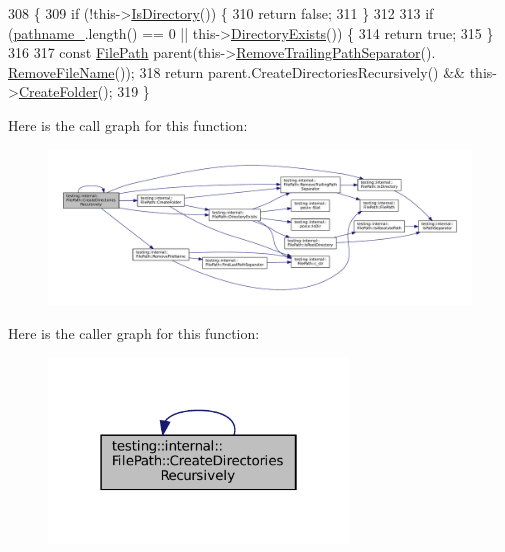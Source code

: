 \begin{DoxyCode}
308                                                   \{
309   \textcolor{keywordflow}{if} (!this->\hyperlink{classtesting_1_1internal_1_1FilePath_a73fc042ad65e85bbecb956eb4603a6f2}{IsDirectory}()) \{
310     \textcolor{keywordflow}{return} \textcolor{keyword}{false};
311   \}
312 
313   \textcolor{keywordflow}{if} (\hyperlink{classtesting_1_1internal_1_1FilePath_a12ce28a0015f85604e0372230fa18d6e}{pathname\_}.length() == 0 || this->\hyperlink{classtesting_1_1internal_1_1FilePath_a74ba8435e822d77f79f137c38de9bfeb}{DirectoryExists}()) \{
314     \textcolor{keywordflow}{return} \textcolor{keyword}{true};
315   \}
316 
317   \textcolor{keyword}{const} \hyperlink{classtesting_1_1internal_1_1FilePath_a3504a51accbca78a52fe586133ea5499}{FilePath} parent(this->\hyperlink{classtesting_1_1internal_1_1FilePath_ab47ada111cc940cf2359f6533bada6ca}{RemoveTrailingPathSeparator}().
      \hyperlink{classtesting_1_1internal_1_1FilePath_a49e030b5a62ca7dcc7f920a63a96fa55}{RemoveFileName}());
318   \textcolor{keywordflow}{return} parent.CreateDirectoriesRecursively() && this->\hyperlink{classtesting_1_1internal_1_1FilePath_ae3a455e7c9fc967c2443b703e958f8bd}{CreateFolder}();
319 \}
\end{DoxyCode}
Here is the call graph for this function\+:
\nopagebreak
\begin{figure}[H]
\begin{center}
\leavevmode
\includegraphics[width=350pt]{classtesting_1_1internal_1_1FilePath_a26790e530dd738f7fc8202c1ce718406_cgraph}
\end{center}
\end{figure}
Here is the caller graph for this function\+:
\nopagebreak
\begin{figure}[H]
\begin{center}
\leavevmode
\includegraphics[width=226pt]{classtesting_1_1internal_1_1FilePath_a26790e530dd738f7fc8202c1ce718406_icgraph}
\end{center}
\end{figure}
